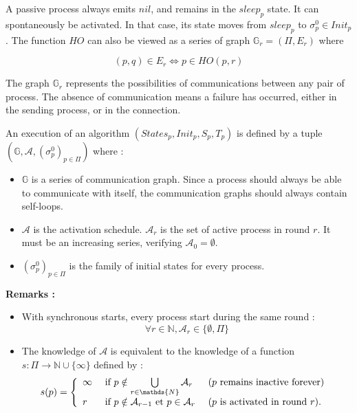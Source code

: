 \documentclass{article}
\begin{document}
A passive process always emits $nil$, and remains in the $sleep_p$ state.
It can spontaneously be activated. In that case, its state moves from $sleep_p$ to $\sigma^0_p \in Init_p$.
The function $HO$ can also be viewed as a series of graph $\mathds{G}_r = (\Pi, E_r)$ where

$$(p, q) \in E_r \Leftrightarrow p \in HO(p, r)$$

The graph $\mathds{G}_r$ represents the possibilities of communications between any pair of process.
The absence of communication means a failure has occurred, either in the sending process, or in the connection.

An execution of an algorithm $(States_p, Init_p, S_p, T_p)$ is defined by a tuple
$(\mathds{G}, \mathcal{A}, (\sigma^0_p)_{p \in \Pi})$ where :

\begin{itemize}
	\item $\mathds{G}$ is a series of communication graph. Since a process should always be able to communicate 
		with itself, the communication graphs should always contain self-loops.
	\item $\mathcal{A}$ is the activation schedule. $\mathcal{A}_r$ is the set of active process in round $r$.
		It must be an increasing series, verifying $\mathcal{A}_0 = \emptyset$.
	\item $(\sigma^0_p)_{p \in \Pi}$ is the family of initial states for every process.
\end{itemize}

\textbf{Remarks :}

\begin{itemize}
	\item With synchronous starts, every process start during the same round : 
		$$\forall r \in \mathds{N}, \mathcal{A}_r \in \{\emptyset, \Pi\}$$

	\item The knowledge of $\mathcal{A}$ is equivalent to the knowledge of a function
		$s : \Pi \rightarrow \mathds{N} \cup \{\infty\}$ defined by :
		$$s(p) = \left \{ \begin{array}{l ll}
		  \infty & \mbox{ if  } p \notin \bigcup\limits_{r \in \mathds{N}}  \mathcal{A}_r & 
			  \mbox { ($p$ remains inactive forever) } \\
		  r  & \mbox{ if  } p \notin \mathcal{A}_{r-1} \mbox{ et } p \in \mathcal{A}_{r}  &
			  \mbox{ ($p$ is activated in round $r$)}.
		  \end{array} \right.$$

\end{itemize}
\end{document}
